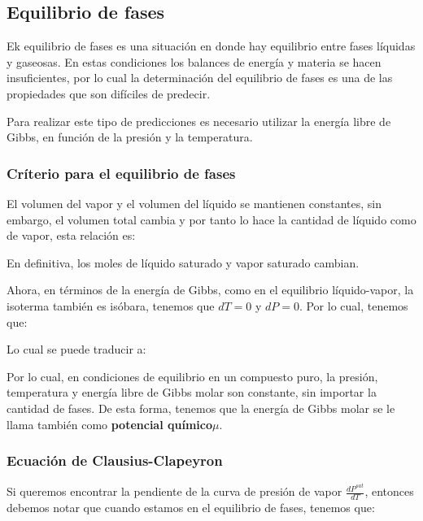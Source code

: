 \subsection{Equilibrio de fases}

Ek equilibrio de fases es una situación en donde hay equilibrio entre fases líquidas y gaseosas. En estas condiciones los balances de energía y materia se hacen insuficientes, por lo cual la determinación del equilibrio de fases
es una de las propiedades que son difíciles de predecir.

Para realizar este tipo de predicciones es necesario utilizar la energía libre de Gibbs, en función de la presión y la temperatura.


\subsubsection{Críterio para el equilibrio de fases}

El volumen del vapor y el volumen del líquido se mantienen constantes, sin embargo, el volumen total cambia y por tanto lo hace la cantidad de líquido como de vapor, esta relación es:


En definitiva, los moles de líquido saturado y vapor saturado cambian.

Ahora, en términos de la energía de Gibbs, como en el equilibrio líquido-vapor, la isoterma también es isóbara, tenemos que $dT=0$ y $dP=0$. Por lo cual, tenemos que:


Lo cual se puede traducir a:


Por lo cual, en condiciones de equilibrio en un compuesto puro, la presión, temperatura y energía libre de Gibbs molar son constante, sin importar la cantidad de fases.
De esta forma, tenemos que la energía de Gibbs molar se le llama también como \textbf{potencial químico}$\mu$.

\subsubsection{Ecuación de Clausius-Clapeyron}

Si queremos encontrar la pendiente de la curva de presión de vapor $\frac{dP^{sat}}{dT}$, entonces debemos notar que cuando estamos en el equilibrio de fases, tenemos que:

